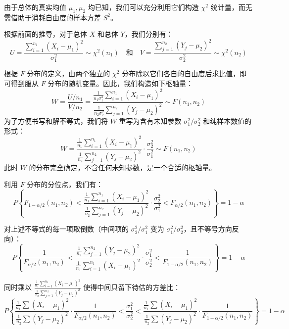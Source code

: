 ﻿\documentclass[lang=cn,11pt]{elegantbook}
\begin{document}
\begin{solution}
由于总体的真实均值 $\mu_1, \mu_2$ 均已知，我们可以充分利用它们构造 $\chi^2$ 统计量，而无需借助于消耗自由度的样本方差 $S^2$。

根据前面的推导，对于总体 $X$ 和总体 $Y$，我们分别有：
\begin{equation*}
U = \frac{\sum_{i=1}^{n_1}(X_i-\mu_1)^2}{\sigma_1^2} \sim \chi^2(n_1) \quad \text{和} \quad V = \frac{\sum_{j=1}^{n_2}(Y_j-\mu_2)^2}{\sigma_2^2} \sim \chi^2(n_2)
\end{equation*}

根据 $F$ 分布的定义，由两个独立的 $\chi^2$ 分布除以它们各自的自由度后求比值，即可得到服从 $F$ 分布的随机变量。因此，我们构造如下枢轴量：
\begin{equation*}
W = \frac{U/n_1}{V/n_2} = \frac{\frac{1}{n_1\sigma_1^2}\sum_{i=1}^{n_1}(X_i-\mu_1)^2}{\frac{1}{n_2\sigma_2^2}\sum_{j=1}^{n_2}(Y_j-\mu_2)^2} \sim F(n_1, n_2)
\end{equation*}
为了方便书写和解不等式，我们将 $W$ 重写为含有未知参数 $\sigma_1^2/\sigma_2^2$ 和纯样本数值的形式：
\begin{equation*}
W = \frac{\frac{1}{n_1}\sum_{i=1}^{n_1}(X_i-\mu_1)^2}{\frac{1}{n_2}\sum_{j=1}^{n_2}(Y_j-\mu_2)^2} \cdot \frac{\sigma_2^2}{\sigma_1^2} \sim F(n_1, n_2)
\end{equation*}
此时 $W$ 的分布完全确定，不含任何未知参数，是一个合适的枢轴量。

利用 $F$ 分布的分位点，我们有：
\begin{equation*}
P\left\{F_{1-\alpha/2}(n_1, n_2) < \frac{\frac{1}{n_1}\sum_{i=1}^{n_1}(X_i-\mu_1)^2}{\frac{1}{n_2}\sum_{j=1}^{n_2}(Y_j-\mu_2)^2} \cdot \frac{\sigma_2^2}{\sigma_1^2} < F_{\alpha/2}(n_1, n_2)\right\}=1-\alpha
\end{equation*}

对上述不等式的每一项取倒数（中间项的 $\sigma_2^2/\sigma_1^2$ 变为 $\sigma_1^2/\sigma_2^2$，且不等号方向反向）：
\begin{equation*}
P\left\{\frac{1}{F_{\alpha/2}(n_1, n_2)} < \frac{\frac{1}{n_2}\sum_{j=1}^{n_2}(Y_j-\mu_2)^2}{\frac{1}{n_1}\sum_{i=1}^{n_1}(X_i-\mu_1)^2} \cdot \frac{\sigma_1^2}{\sigma_2^2} < \frac{1}{F_{1-\alpha/2}(n_1, n_2)}\right\}=1-\alpha
\end{equation*}

同时乘以 $\frac{\frac{1}{n_1}\sum_{i=1}^{n_1}(X_i-\mu_1)^2}{\frac{1}{n_2}\sum_{j=1}^{n_2}(Y_j-\mu_2)^2}$ 使得中间只留下待估的方差比：
\begin{equation*}
P\left\{\frac{\frac{1}{n_1}\sum(X_i-\mu_1)^2}{\frac{1}{n_2}\sum(Y_j-\mu_2)^2} \cdot \frac{1}{F_{\alpha/2}(n_1, n_2)} < \frac{\sigma_1^2}{\sigma_2^2} < \frac{\frac{1}{n_1}\sum(X_i-\mu_1)^2}{\frac{1}{n_2}\sum(Y_j-\mu_2)^2} \cdot \frac{1}{F_{1-\alpha/2}(n_1, n_2)}\right\}=1-\alpha
\end{equation*}


\end{solution}
\end{document}
